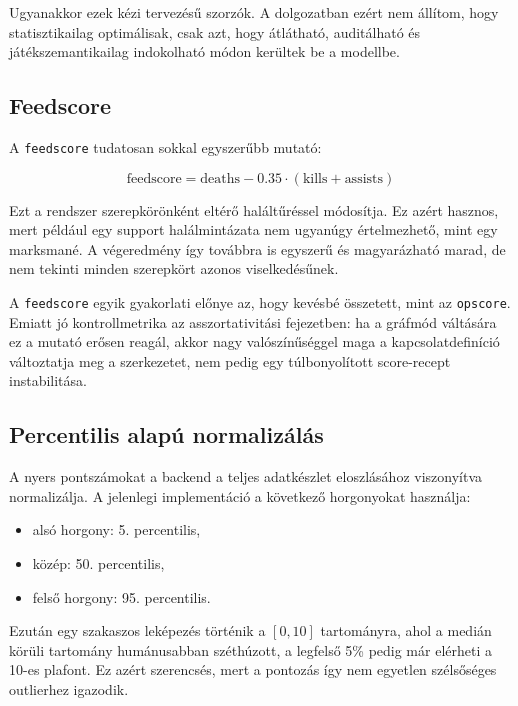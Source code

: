 \documentclass[a4paper,12pt]{report}
\begin{document}
Ugyanakkor ezek kézi tervezésű szorzók. A dolgozatban ezért nem állítom, hogy statisztikailag optimálisak, csak azt, hogy átlátható, auditálható és játékszemantikailag indokolható módon kerültek be a modellbe.

\subsection{Feedscore}

A \texttt{feedscore} tudatosan sokkal egyszerűbb mutató:

\begin{equation}
\text{feedscore} = \text{deaths} - 0.35 \cdot (\text{kills} + \text{assists})
\end{equation}

Ezt a rendszer szerepkörönként eltérő haláltűréssel módosítja. Ez azért hasznos, mert például egy support halálmintázata nem ugyanúgy értelmezhető, mint egy marksmané. A végeredmény így továbbra is egyszerű és magyarázható marad, de nem tekinti minden szerepkört azonos viselkedésűnek.

A \texttt{feedscore} egyik gyakorlati előnye az, hogy kevésbé összetett, mint az \texttt{opscore}. Emiatt jó kontrollmetrika az asszortativitási fejezetben: ha a gráfmód váltására ez a mutató erősen reagál, akkor nagy valószínűséggel maga a kapcsolatdefiníció változtatja meg a szerkezetet, nem pedig egy túlbonyolított score-recept instabilitása.

\subsection{Percentilis alapú normalizálás}

A nyers pontszámokat a backend a teljes adatkészlet eloszlásához viszonyítva normalizálja. A jelenlegi implementáció a következő horgonyokat használja:

\begin{itemize}
    \item alsó horgony: 5. percentilis,
    \item közép: 50. percentilis,
    \item felső horgony: 95. percentilis.
\end{itemize}

Ezután egy szakaszos leképezés történik a \([0,10]\) tartományra, ahol a medián körüli tartomány humánusabban széthúzott, a legfelső 5\% pedig már elérheti a 10-es plafont. Ez azért szerencsés, mert a pontozás így nem egyetlen szélsőséges outlierhez igazodik.
\end{document}

